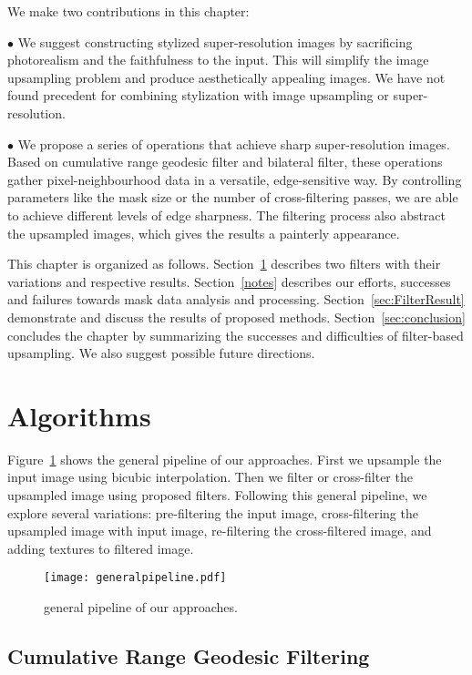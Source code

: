 We make two contributions in this chapter:

$\bullet$ We suggest constructing stylized super-resolution images by sacrificing photorealism and the faithfulness to the input. This will simplify the image upsampling problem and produce aesthetically appealing images. We have not found precedent for combining stylization with image upsampling or super-resolution.

$\bullet$ We propose a series of operations that achieve sharp super-resolution images. Based on cumulative range geodesic filter and bilateral filter, these operations gather pixel-neighbourhood data in a versatile, edge-sensitive way.  By controlling parameters like the mask size or the number of cross-filtering passes, we are able to achieve different levels of edge sharpness. The filtering process also abstract the upsampled images, which gives the results a painterly appearance.

This chapter is organized as follows. Section~\ref{sec:algorithm} describes two filters with their variations and respective results. 
Section~\ref{notes} describes our efforts, successes and failures towards mask data analysis and processing. Section~\ref{sec:FilterResult} demonstrate and discuss the results of proposed methods.
Section~\ref{sec:conclusion} concludes the chapter by summarizing the successes and difficulties of filter-based upsampling. We also suggest possible future directions. 

\section{Algorithms}\label{sec:algorithm}

Figure~\ref{fig:generalPipeline} shows the general pipeline of our approaches. First we upsample the input image using bicubic interpolation. Then we filter or cross-filter the upsampled image using proposed filters. Following this general pipeline, we explore several variations: pre-filtering the input image, cross-filtering the upsampled image with input image, re-filtering the cross-filtered image, and adding textures to filtered image.

\begin{figure}[htbp]\centering
\texttt{[image: generalpipeline.pdf]}
\caption{general pipeline of our approaches.}
\label {fig:generalPipeline}
\end{figure}


\subsection{Cumulative Range Geodesic Filtering}

